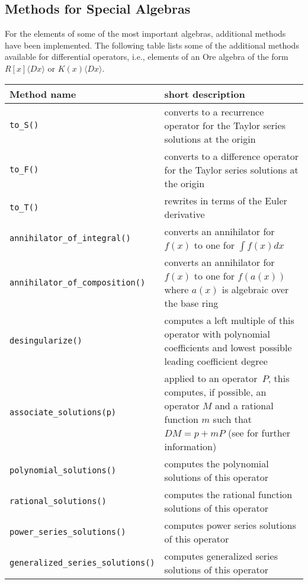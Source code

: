 \documentclass{llncs}
\def\<#1>{\langle#1\rangle}
\begin{document}
\subsection{Methods for Special Algebras}

For the elements of some of the most important algebras, additional methods have
been implemented. The following table lists some of the additional methods
available for differential operators, i.e., elements of an Ore algebra of the
form~$R[x]\<Dx>$ or $K(x)\<Dx>$.

\begin{center}
  \begin{tabular}{|l|p{.55\hsize}|}
    \hline
    Method name & short description \\\hline
    \verb|to_S()| & converts to a recurrence operator for the Taylor series solutions at the origin \\
    \verb|to_F()| & converts to a difference operator for the Taylor series solutions at the origin \\
    \verb|to_T()| & rewrites in terms of the Euler derivative \\
    \verb|annihilator_of_integral()| & converts an annihilator for $f(x)$ to one for $\int f(x) dx$\\
    \verb|annihilator_of_composition()| & converts an annihilator for $f(x)$ to one for $f(a(x))$ where $a(x)$ is algebraic over the base ring\\
    \verb|desingularize()| & computes a left multiple of this operator with polynomial coefficients and 
           lowest possible leading coefficient degree\\
    \verb|associate_solutions(p)| & applied to an operator~$P$, this computes, if possible, an operator $M$
    and a rational function $m$ such that $DM=p+mP$ (see \cite{abramov99} for further information)\\
    \verb|polynomial_solutions()| & computes the polynomial solutions of this operator\\
    \verb|rational_solutions()| & computes the rational function solutions of this operator\\
    \verb|power_series_solutions()| & computes power series solutions of this operator\\
    \verb|generalized_series_solutions()| & computes generalized series solutions of this operator \\ \hline
  \end{tabular}
\end{center}
\end{document}
